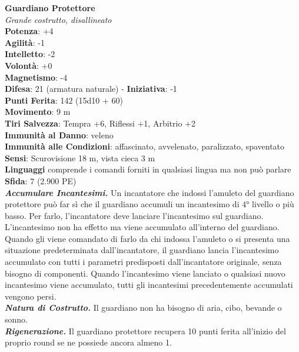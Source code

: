 \begin{multicols}{2}
\medskip\textbf{Guardiano Protettore}\\
\emph{Grande costrutto, disallineato}\\
\textbf{Potenza}: +4\\
\textbf{Agilità}: -1\\
\textbf{Intelletto}: -2\\
\textbf{Volontà}: +0\\
\textbf{Magnetismo}: -4\\
\textbf{Difesa}: 21 (armatura naturale) - \textbf{Iniziativa}: -1\\
\textbf{Punti Ferita}: 142 (15d10 + 60)\\
\textbf{Movimento}: 9 m\\
\textbf{Tiri Salvezza}: Tempra +6, Riflessi +1, Arbitrio +2\\
\textbf{Immunità al Danno}: veleno\\
\textbf{Immunità alle Condizioni}: affascinato, avvelenato, paralizzato, spaventato\\
\textbf{Sensi}: Scurovisione 18 m, vista cieca 3 m \\
\textbf{Linguaggi} comprende i comandi forniti in qualsiasi lingua ma non può parlare\\
\textbf{Sfida}: 7 (2.900 PE)\smallskip\\
\emph{\textbf{Accumulare Incantesimi.}} Un incantatore che indossi l'amuleto del guardiano protettore può far sì che il guardiano accumuli un incantesimo di 4° livello o più basso. Per farlo, l'incantatore deve lanciare l'incantesimo sul guardiano. L'incantesimo non ha effetto ma viene accumulato all'interno del guardiano. Quando gli viene comandato di farlo da chi indossa l'amuleto o si presenta una situazione predeterminata dall'incantatore, il guardiano lancia l'incantesimo accumulato con tutti i parametri predisposti dall'incantatore originale, senza bisogno di componenti. Quando l'incantesimo viene lanciato o qualsiasi nuovo incantesimo viene accumulato, tutti gli incantesimi precedentemente accumulati vengono persi.\\
\emph{\textbf{Natura di Costrutto.}} Il guardiano non ha bisogno di aria, cibo, bevande o sonno.\\
\emph{\textbf{Rigenerazione.}} Il guardiano protettore recupera 10 punti  ferita all'inizio del proprio round se ne possiede ancora almeno 1.\\

\end{multicols}
